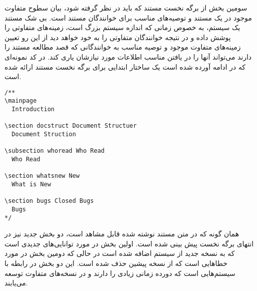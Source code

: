   سومین بخش از برگه نخست مستند که باید در نظر گرفته شود، بیان سطوح متفاوت موجود
  در یک مستند و توصیه‌های مناسب برای خوانندگان مستند است. بی شک مستند یک سیستم،
  به خصوص زمانی که اندازه سیستم بزرگ است، زمینه‌های متفاوتی را پوشش داده و در
  نتیجه خوانندگان متفاوتی را به خود خواهد دید از این رو تعیین زمینه‌های متفاوت
  موجود و توصیه مناسب به خوانندگانی که قصد مطالعه مستند را دارند می‌تواند آنها
  را در یافتن مناسب اطلاعات مورد نیازشان یاری کند. در کد نمونه‌ای که در ادامه
  آورده شده است یک ساختار ابتدایی برای برگه نخست مستند ارائه شده است.
\begin{latin}
\lstset{language=C++}
\begin{lstlisting}[frame=single] 
/**
\mainpage
  Introduction

\section docstruct Document Structuer
  Document Struction

\subsection whoread Who Read
  Who Read

\section whatsnew New
  What is New

\section bugs Closed Bugs
  Bugs
*/
\end{lstlisting}
\end{latin}

  همان گونه که در متن مستند نوشته شده قابل مشاهد است، دو بخش جدید نیز در انتهای
  برگه نخست پیش بینی شده است.
  اولین بخش در مورد توانایی‌های جدیدی است که به نسخه جدید از سیستم اضافه شده است
  در حالی که دومین بخش در مورد خطا‌هایی است که از نسخه پیشین حذف شده است. این دو
  بخش در رابطه با سیستم‌هایی است که دورده زمانی زیادی را دارند و در نسخه‌های
  متفاوت توسعه می‌یابند.

  